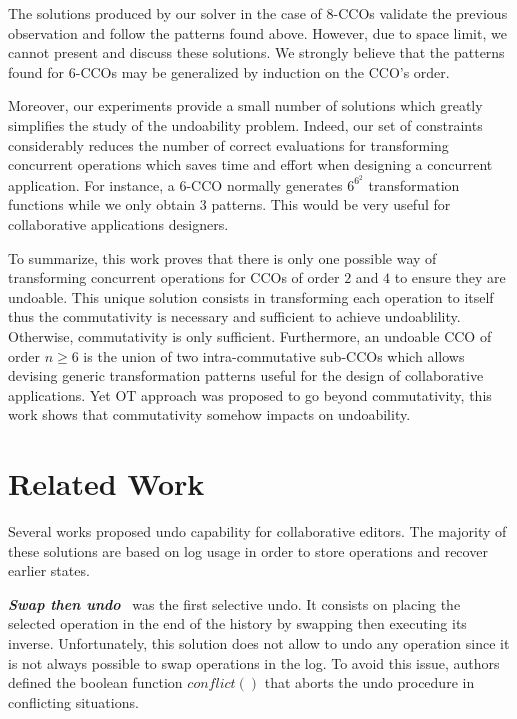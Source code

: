 \documentclass[submission,copyright,creativecommons]{eptcs}
\begin{document}
The solutions produced by our solver in the case of $8$-CCOs validate the previous observation and follow the patterns found above. However, due to space limit, we cannot present and discuss these solutions.  We strongly believe that the patterns found for $6$-CCOs  may be generalized  by induction  on the CCO's order. 




Moreover, our experiments provide a small number of solutions which greatly simplifies the study of the undoability problem. Indeed, our set of constraints  considerably reduces the number of correct evaluations for transforming concurrent operations which  saves time and effort when designing a concurrent application. For instance, a $6$-CCO normally generates $6^{6^2}$ transformation functions while we  only obtain $3$ patterns. 
This would be very useful for collaborative applications designers.

To summarize, this work proves that there is only one possible way of transforming concurrent operations for CCOs of order $2$ and $4$ to ensure they are undoable. This unique solution consists in transforming each operation to itself thus the commutativity is necessary and sufficient to achieve undoablility. Otherwise,   commutativity is only sufficient. Furthermore, an undoable CCO of order $n\geq 6$ is the union of two intra-commutative sub-CCOs which allows devising generic transformation patterns useful for the design of collaborative applications.  Yet OT approach was proposed to go beyond commutativity, this work shows that commutativity somehow impacts on undoability.

 

\section{Related Work}
Several works proposed undo capability for   collaborative editors.
The majority of these solutions are based on log usage in order to store operations and recover earlier states.

\emph{\textbf{Swap then undo}}~\cite{Atul94} was the first selective undo. It consists on  placing the selected
operation in the end of the history by swapping then executing its inverse.
Unfortunately, this solution does not allow to undo any operation since it is not always possible to swap operations in the log.   To avoid this issue, authors defined the boolean function $conflict()$  that aborts the undo procedure in conflicting situations.
\end{document}
